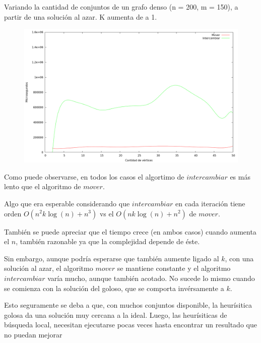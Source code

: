 \vspace*{0.5cm}

Variando la cantidad de conjuntos de un grafo denso (n = 200, m = 150), a partir
de una solución al azar. K aumenta de a 1.
\vspace*{0.5cm}

\begin{figure}[h]
  \begin{center}
    \includegraphics[scale=0.35]{imagenes/local-random-k-tiempo.png}
  \end{center}
\end{figure}

\vspace*{0.5cm}


Como puede observarse, en todos los casos el algortimo de $intercambiar$ es más
lento que el algoritmo de $mover$.

Algo que era esperable considerando que $intercambiar$ en cada iteración tiene
orden $O(n^2k\log(n) + n^3)$ vs el $O(nk\log(n) + n^2)$ de $mover$.

También se puede apreciar que el tiempo crece (en ambos casos) cuando aumenta
el $n$, también razonable ya que la complejidad depende de éste.

Sin embargo, aunque podría esperarse que también aumente ligado al $k$, con
una solución al azar, el algoritmo $mover$ se mantiene constante y el
algoritmo $intercambiar$ varía mucho, aunque también acotado. No sucede lo
mismo cuando se comienza con la solución del goloso, que se comporta
invérsamente a $k$.

Esto seguramente se deba a que, con muchos conjuntos disponible, la heurísitica
golosa da una solución muy cercana a la ideal. Luego, las heurísiticas de
búsqueda local, necesitan ejecutarse pocas veces hasta encontrar un resultado
que no puedan mejorar

